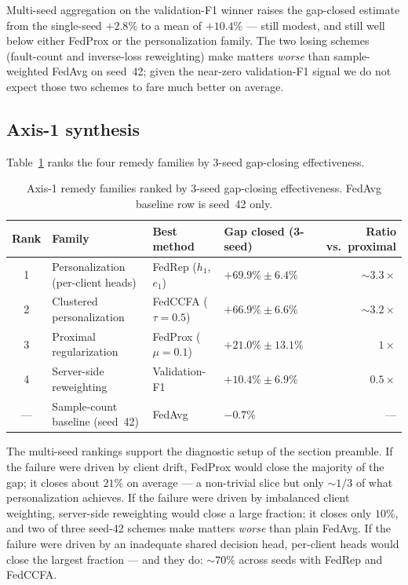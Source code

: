 \documentclass[a4paper,fleqn,doubleblind]{cas-sc}
\newcommand{\tblhead}{\rowcolor{tblHeadBg}}
\newcommand{\zebra}{\rowcolors{2}{tblAltBg}{white}}
\newcommand{\tblhead}{}
\newcommand{\zebra}{}
\begin{document}
Multi-seed aggregation on the validation-F1 winner raises the
gap-closed estimate from the single-seed $+2.8\%$ to a mean of
$+10.4\%$ --- still modest, and still well below either FedProx or
the personalization family. The two losing schemes (fault-count and
inverse-loss reweighting) make matters \emph{worse} than
sample-weighted FedAvg on seed~42; given the near-zero validation-F1
signal we do not expect those two schemes to fare much better on
average.

\subsection{Axis-1 synthesis}
\label{sec:axis1-results-synth}

Table~\ref{tab:axis1-synth} ranks the four remedy families by 3-seed
gap-closing effectiveness.

\begin{table}[pos=tbp]
\centering
\small
\caption{Axis-1 remedy families ranked by 3-seed gap-closing
effectiveness. FedAvg baseline row is seed~42 only.}
\label{tab:axis1-synth}
\zebra
\begin{tabular}{clllr}
\toprule
\tblhead
Rank & Family & Best method & Gap closed (3-seed) & Ratio vs.\ proximal \\
\midrule
1 & Personalization (per-client heads) & FedRep ($h_1$, $e_1$) & \textbf{$+69.9\% \pm 6.4\%$} & \textbf{$\sim 3.3\times$} \\
2 & Clustered personalization & FedCCFA ($\tau = 0.5$) & $+66.9\% \pm 6.6\%$ & $\sim 3.2\times$ \\
3 & Proximal regularization & FedProx ($\mu = 0.1$) & $+21.0\% \pm 13.1\%$ & $1\times$ \\
4 & Server-side reweighting & Validation-F1 & $+10.4\% \pm 6.9\%$ & $0.5\times$ \\
--- & Sample-count baseline (seed~42) & FedAvg & $-0.7\%$ & --- \\
\bottomrule
\end{tabular}
\end{table}

The multi-seed rankings support the diagnostic setup of the section
preamble. If the failure were driven by client drift, FedProx would
close the majority of the gap; it closes about $21\%$ on average --- a
non-trivial slice but only $\sim 1/3$ of what personalization achieves.
If the failure were driven by imbalanced client weighting, server-side
reweighting would close a large fraction; it closes only $10\%$, and
two of three seed-42 schemes make matters \emph{worse} than plain
FedAvg. If the failure were driven by an inadequate shared decision
head, per-client heads would close the largest fraction --- and they
do: $\sim 70\%$ across seeds with FedRep and FedCCFA.
\end{document}
